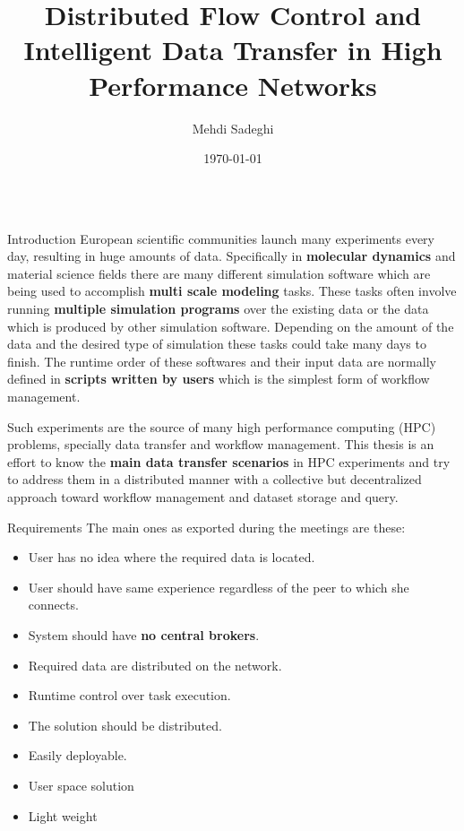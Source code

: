\documentclass[final,hyperref={pdfpagelabels=true}]{beamer}
\title[Communication and Media Engineering]{Distributed Flow Control and Intelligent Data Transfer in High Performance Networks}
\author[msadeghi@stud.hs-offenburg.de]{Mehdi Sadeghi}
\institute[]{%
  Hochschule für Technik, Wirtschaft und Medien Offenburg\\[0.25\baselineskip]
  Fakultät Medien und Informationswesen\\[0.25\baselineskip]
  Professorin: Dr. Katharina Mehner-Heindl\\[0.25\baselineskip]
  Betreuer: Dr. Adham Hashibon
}
\date[\today]{\today}
\begin{document}
\begin{frame}
  \begin{columns}[t]
    \begin{column}{.45\textwidth}
      \begin{block}{Introduction}
European scientific communities launch many experiments every day, resulting in huge amounts
of data. Specifically in \textbf{molecular dynamics} and material science fields there are many different
simulation software which are being used to accomplish \textbf{multi scale modeling} tasks. These tasks
often involve running \textbf{multiple simulation programs} over the existing data or the data which is
produced by other simulation software. Depending on the amount of the data and the desired type of simulation
these tasks could take many days to finish. The runtime order of these softwares and 
their input data are normally defined in \textbf{scripts written by users} which is the simplest
form of workflow management.

Such experiments are the source of many high performance computing (HPC) problems, specially data transfer
and workflow management. This thesis is an effort to know the \textbf{main data transfer scenarios} in HPC experiments 
and try to address them in a distributed manner with a collective but decentralized approach toward workflow management
and dataset storage and query.

      \end{block}
      
      \begin{block}{Requirements}
      The main ones as exported during the meetings are these:
        \begin{itemize}
        \item User has no idea where the required data is located.
        \item User should have same experience regardless of the peer to which she connects.
        \item System should have \textbf{no central brokers}.
        \item Required data are distributed on the network.
        \item Runtime control over task execution.
        \item The solution should be distributed.
        \item Easily deployable.
        \item User space solution
        \item Light weight
        \end{itemize}
      \end{block}
    \end{column}


\end{columns}
\end{frame}
\end{document}
